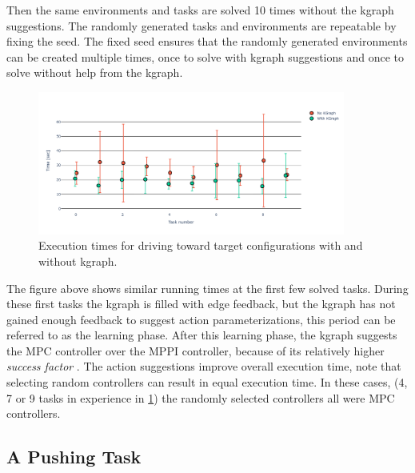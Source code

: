 Then the same environments and tasks are solved 10 times without the \ac{kgraph} suggestions. The randomly generated tasks and environments are repeatable by fixing the seed. The fixed seed ensures that the randomly generated environments can be created multiple times, once to solve with \ac{kgraph} suggestions and once to solve without help from the \ac{kgraph}.\bs

\begin{figure}[H]
    \centering
    \includegraphics[width=0.9\textwidth]{figures/results/random_drive_with_without_kgraph}
    \caption{Execution times for driving toward target configurations with and without \ac{kgraph}.}%
    \label{fig:results_random_drive_task}
\end{figure}

The figure above shows similar running times at the first few solved tasks. During these first tasks the \ac{kgraph} is filled with edge feedback, but the \ac{kgraph} has not gained enough feedback to suggest action parameterizations, this period can be referred to as the learning phase. After this learning phase, the \ac{kgraph} suggests the \ac{MPC} controller over the \ac{MPPI} controller, because of its relatively higher \textit{success factor} . The action suggestions improve overall execution time, note that selecting random controllers can result in equal execution time. In these cases, (4, 7 or 9 tasks in experience in \cref{fig:results_random_drive_task}) the randomly selected controllers all were \ac{MPC} controllers.\bs


\subsection{A Pushing Task}%
\label{subsec:rand_pushing}


